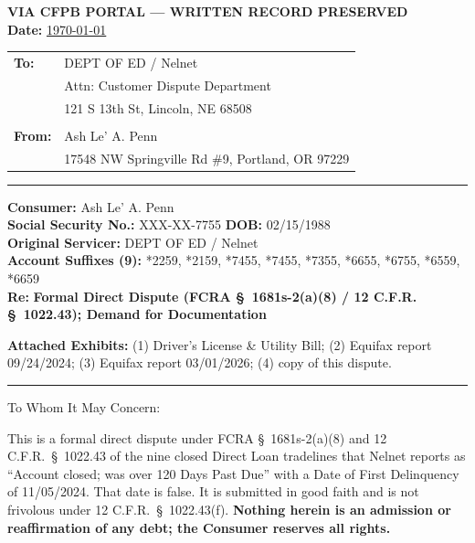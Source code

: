 \documentclass[12pt,letterpaper]{article}
\begin{document}
\begin{center}
  \textbf{VIA CFPB PORTAL --- WRITTEN RECORD PRESERVED} \\
  \textbf{Date:} \underline{\today}
\end{center}

\begin{tabular}{@{}ll}
  \textbf{To:}   & DEPT OF ED / Nelnet \\
                 & Attn: Customer Dispute Department \\
                 & 121 S 13th St, Lincoln, NE 68508 \\
                 & \\
  \textbf{From:} & Ash Le' A. Penn \\
                 & 17548 NW Springville Rd \#9, Portland, OR 97229 \\
\end{tabular}

\vspace{1em}\hrule\vspace{1em}

\textbf{Consumer:} Ash Le' A. Penn \\
\textbf{Social Security No.:} XXX-XX-7755 \quad \textbf{DOB:} 02/15/1988 \\
\textbf{Original Servicer:} DEPT OF ED / Nelnet \\
\textbf{Account Suffixes (9):} *2259, *2159, *7455, *7455, *7355, *6655, *6755, *6559, *6659 \\
\textbf{Re:} \textbf{Formal Direct Dispute (FCRA \S~1681s-2(a)(8) / 12 C.F.R. \S~1022.43); Demand for Documentation}

\vspace{1em}
\textbf{Attached Exhibits:} (1) Driver's License \& Utility Bill; (2) Equifax report 09/24/2024; (3) Equifax report 03/01/2026; (4) copy of this dispute.

\vspace{1em}\hrule\vspace{1em}

To Whom It May Concern:

This is a formal direct dispute under FCRA \S~1681s-2(a)(8) and 12 C.F.R.\ \S~1022.43 of the nine closed Direct Loan tradelines that Nelnet reports as ``Account closed; was over 120 Days Past Due'' with a Date of First Delinquency of 11/05/2024. That date is false. It is submitted in good faith and is not frivolous under 12 C.F.R.\ \S~1022.43(f). \textbf{Nothing herein is an admission or reaffirmation of any debt; the Consumer reserves all rights.}
\end{document}
